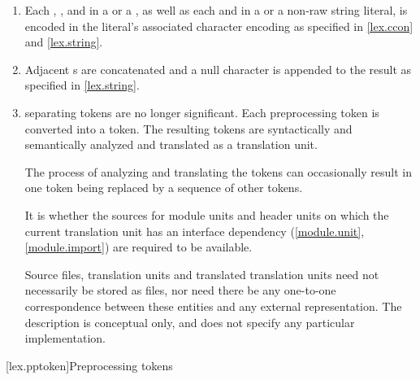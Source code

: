 \documentclass{wg21}
\begin{document}
\begin{enumerate}
\item
Each
,
, and
in a  or a ,
as well as each
 and 
in a  or a non-raw string literal,
is encoded in the literal's associated character encoding as specified in
\ref{lex.ccon} and \ref{lex.string}.

\item
Adjacent s are concatenated
and a null character is appended to the result
as specified in \ref{lex.string}.

\item {} separating tokens are no longer
significant. Each preprocessing token is converted into a
token. The resulting tokens are syntactically and
semantically analyzed and translated as a translation unit.
\begin{note}
    The process of analyzing and translating the tokens can occasionally
    result in one token being replaced by a sequence of other
    tokens.
\end{note}
It is
whether the sources for
module units and header units
on which the current translation unit has an interface
dependency (\ref{module.unit}, \ref{module.import})
are required to be available.
\begin{note}
    Source files, translation
    units and translated translation units need not necessarily be stored as
    files, nor need there be any one-to-one correspondence between these
    entities and any external representation. The description is conceptual
    only, and does not specify any particular implementation.
\end{note}
\end{enumerate}

[lex.pptoken]{Preprocessing tokens}
\end{document}
